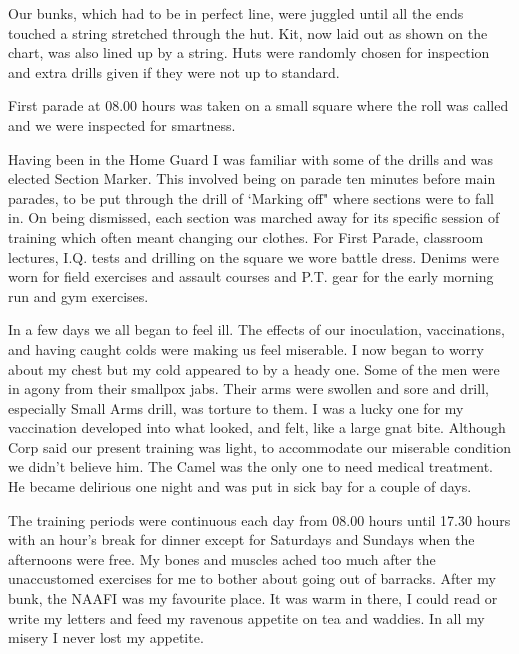 Our bunks, which had to be in perfect line, were juggled until all the
ends touched a string stretched through the hut. Kit, now laid out as
shown on the chart, was also lined up by a string. Huts were randomly
chosen for inspection and extra drills given if they were not up to
standard.

First parade at 08.00 hours was taken on a small square where the roll
was called and we were inspected for smartness.

Having been in the Home Guard I was familiar with some of the drills
and was elected Section Marker. This involved being on parade ten
minutes before main parades, to be put through the drill of `Marking
off" where sections were to fall in. On being dismissed, each section
was marched away for its specific session of training which often
meant changing our clothes. For First Parade, classroom lectures,
I.Q. tests and drilling on the square we wore battle dress. Denims
were worn for field exercises and assault courses and P.T. gear for
the early morning run and gym exercises.

In a few days we all began to feel ill. The effects of our
inoculation, vaccinations, and having caught colds were making us
feel miserable. I now began to worry about my chest but my cold
appeared to by a heady one. Some of the men were in agony from their
smallpox jabs. Their arms were swollen and sore and drill, especially
Small Arms drill, was torture to them. I was a lucky one for my
vaccination developed into what looked, and felt, like a large gnat
bite. Although Corp said our present training was light, to
accommodate our miserable condition we didn't believe him. The Camel
was the only one to need medical treatment. He became delirious one
night and was put in sick bay for a couple of days.

The training periods were continuous each day from 08.00 hours until
17.30 hours with an hour's break for dinner except for Saturdays and
Sundays when the afternoons were free. My bones and muscles ached too
much after the unaccustomed exercises for me to bother about going out
of barracks. After my bunk, the NAAFI was my favourite place. It was
warm in there, I could read or write my letters and feed my ravenous
appetite on tea and waddies. In all my misery I never lost my
appetite.

